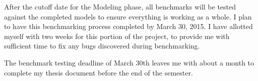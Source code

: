 After the cutoff date for the Modeling phase, all benchmarks will be tested against the completed models to ensure everything is working as a whole.  I plan to have this benchmarking process completed by March 30, 2015.  I have allotted myself with two weeks for this portion of the project, to provide me with sufficient time to fix any bugs discovered during benchmarking.  

The benchmark testing deadline of March 30th leaves me with about a month to complete my thesis document before the end of the semester.

